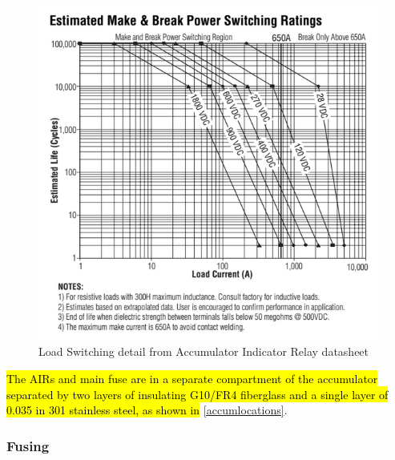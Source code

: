 \documentclass{article}
\DeclareRobustCommand{\hlr}[1]{{\sethlcolor{red}\hl{#1}}}
\begin{document}
            \begin{figure}[H]
                \centering
                \includegraphics[width = 0.7 \textwidth]{AIRswitching}
                \caption{Load Switching detail from Accumulator Indicator Relay datasheet}
                \label{airswitch}
            \end{figure}

            \hlr{The AIRs and main fuse are in a separate compartment of the accumulator separated by two layers of insulating G10/FR4 fiberglass and a single layer of 0.035 in 301 stainless steel, as shown in} \ref{accumlocations}.

        \subsubsection{Fusing} \label{fusing}

\end{document}
